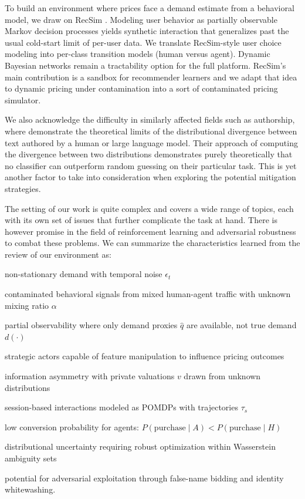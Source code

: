 To build an environment where prices face a demand estimate from a behavioral model, we draw on RecSim \parencite{ie_recsim_2019}. Modeling user behavior as partially observable Markov decision processes yields synthetic interaction that generalizes past the usual cold-start limit of per-user data. We translate RecSim-style user choice modeling into per-class transition models (human versus agent). Dynamic Bayesian networks remain a tractability option for the full platform. RecSim's main contribution is a sandbox for recommender learners and we adapt that idea to dynamic pricing under contamination into a sort of contaminated pricing simulator.

We also acknowledge the difficulty in similarly affected fields such as authorship, where \textcite{ganie_uncertainty_2025} demonstrate the theoretical limits of the distributional divergence between text authored by a human or large language model. Their approach of computing the divergence between two distributions demonstrates purely theoretically that no classifier can outperform random guessing on their particular task. This is yet another factor to take into consideration when exploring the potential mitigation strategies.

The setting of our work is quite complex and covers a wide range of topics, each with its own set of issues that further complicate the task at hand. There is however promise in the field of reinforcement learning and adversarial robustness to combat these problems. We can summarize the characteristics learned from the review of our environment as:
\begin{enumerate*}[label=(\roman*)]
\item non-stationary demand with temporal noise $\epsilon_t$
\item contaminated behavioral signals from mixed human-agent traffic with unknown mixing ratio $\alpha$
\item partial observability where only demand proxies $\hat{q}$ are available, not true demand $d(\cdot)$
\item strategic actors capable of feature manipulation to influence pricing outcomes
\item information asymmetry with private valuations $v$ drawn from unknown distributions
\item session-based interactions modeled as POMDPs with trajectories $\tau_s$
\item low conversion probability for agents: $P(\text{purchase} \mid A) < P(\text{purchase} \mid H)$
\item distributional uncertainty requiring robust optimization within Wasserstein ambiguity sets
\item potential for adversarial exploitation through false-name bidding and identity whitewashing.
\end{enumerate*}


